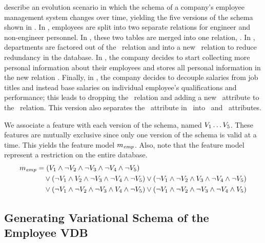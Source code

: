 \citet{prima08Moon} describe an evolution scenario in which the schema of a
company's employee management system changes over time, yielding the five
versions of the schema shown in .
%
In \vOne, employees are split into two separate relations for
engineer and non-engineer personnel.
%
In \vTwo, these two tables are merged into one relation, \empacct.
%
In \vThree, departments are factored out of the \empacct\ relation and
into a new \dept\ relation to reduce redundancy in the database.
%
In \vFour, the company decides to start collecting more personal
information about their employees and stores all personal information in the
new relation \empbio.
%
Finally, in \vFive, the company decides to decouple salaries from
job titles and instead base salaries on individual employee's qualifications
and performance; this leads to dropping the \job\ relation and adding a new
\salary\ attribute to the \empacct\ relation. This version also separates the
\name\ attribute in \empbio\ into \fname\ and \lname\ attributes.


We associate a feature with each version of the schema, named 
$\vOne\ldots\vFive$.
%
These features are mutually exclusive since only one version of the
schema is valid at a time. This yields the  feature model
$\fModel_\employee$.
%
 Also, note that the feature model represent a restriction on the entire
 database.
%
\begin{align*}
\fModel_\employee
  &=   \left(\vOne\wedge\neg\vTwo\wedge\neg\vThree\wedge\neg\vFour\wedge\neg\vFive\right)\\
  &\quad
  \vee\left(\neg\vOne\wedge\vTwo\wedge\neg\vThree\wedge\neg\vFour\wedge\neg\vFive\right)
  \vee\left(\neg\vOne\wedge\neg\vTwo\wedge\vThree\wedge\neg\vFour\wedge\neg\vFive\right)\\
   &\quad
   \vee\left(\neg\vOne\wedge\neg\vTwo\wedge\neg\vThree\wedge\vFour\wedge\neg\vFive\right)
  \vee\left(\neg\vOne\wedge\neg\vTwo\wedge\neg\vThree\wedge\neg\vFour\wedge\vFive\right)
\end{align*}



\subsection{Generating Variational Schema of the Employee VDB}
\label{sec:emp-vsch}


